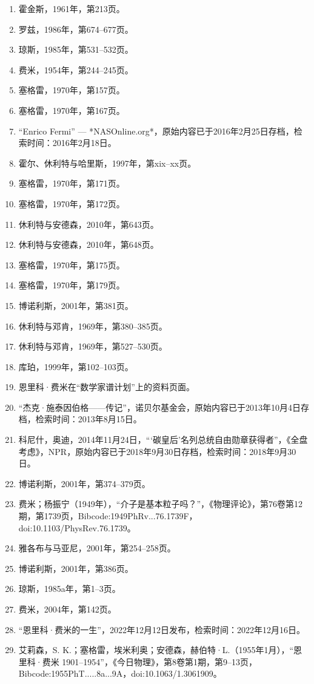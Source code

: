 \begin{enumerate}
\item 霍金斯，1961年，第213页。
\item 罗兹，1986年，第674–677页。
\item 琼斯，1985年，第531–532页。
\item 费米，1954年，第244–245页。
\item 塞格雷，1970年，第157页。
\item 塞格雷，1970年，第167页。
\item “Enrico Fermi” — *NASOnline.org*，原始内容已于2016年2月25日存档，检索时间：2016年2月18日。
\item 霍尔、休利特与哈里斯，1997年，第xix–xx页。
\item 塞格雷，1970年，第171页。
\item 塞格雷，1970年，第172页。
\item 休利特与安德森，2010年，第643页。
\item 休利特与安德森，2010年，第648页。
\item 塞格雷，1970年，第175页。
\item 塞格雷，1970年，第179页。
\item 博诺利斯，2001年，第381页。
\item 休利特与邓肯，1969年，第380–385页。
\item 休利特与邓肯，1969年，第527–530页。
\item 库珀，1999年，第102–103页。
\item 恩里科·费米在“数学家谱计划”上的资料页面。
\item “杰克·施泰因伯格——传记”，诺贝尔基金会，原始内容已于2013年10月4日存档，检索时间：2013年8月15日。
\item 科尼什，奥迪，2014年11月24日，“‘碳皇后’名列总统自由勋章获得者”，《全盘考虑》，NPR，原始内容已于2018年9月30日存档，检索时间：2018年9月30日。
\item 博诺利斯，2001年，第374–379页。
\item 费米；杨振宁（1949年），“介子是基本粒子吗？”，《物理评论》，第76卷第12期，第1739页，Bibcode:1949PhRv...76.1739F，doi:10.1103/PhysRev.76.1739。
\item 雅各布与马亚尼，2001年，第254–258页。
\item 博诺利斯，2001年，第386页。
\item 琼斯，1985a年，第1–3页。
\item 费米，2004年，第142页。
\item “恩里科·费米的一生”，2022年12月12日发布，检索时间：2022年12月16日。
\item 艾莉森，S. K.；塞格雷，埃米利奥；安德森，赫伯特·L.（1955年1月），“恩里科·费米 1901–1954”，《今日物理》，第8卷第1期，第9–13页，Bibcode:1955PhT.....8a...9A，doi:10.1063/1.3061909。

\end{enumerate}
